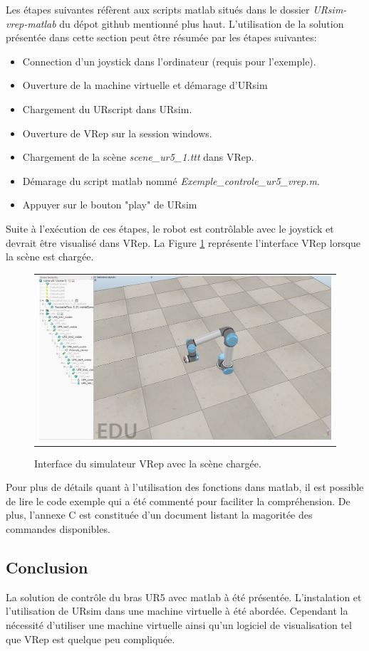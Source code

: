 \documentclass[root.tex]{subfiles}
\begin{document}
Les étapes suivantes réfèrent aux scripts matlab situés dans le dossier \textit{URsim-vrep-matlab} du dépot github mentionné plus haut.
L'utilisation de la solution présentée dans cette section peut être résumée par les étapes suivantes:

\begin{itemize}
\item Connection d'un joystick dans l'ordinateur (requis pour l'exemple).
\item Ouverture de la machine virtuelle et démarage d'URsim
\item Chargement du URscript dans URsim.
\item Ouverture de VRep sur la session windows.
\item Chargement de la scène \textit{scene\_ur5\_1.ttt} dans VRep.
\item Démarage du script matlab nommé \textit{Exemple\_controle\_ur5\_vrep.m}.
\item Appuyer sur le bouton "play" de URsim
\end{itemize}

Suite à l'exécution de ces étapes, le robot est contrôlable avec le joystick et devrait être visualisé dans VRep. La Figure \ref{fig:vrep_scene} représente l'interface VRep lorsque la scène est chargée.
\begin{figure}
 \begin{center}
  \begin{tabular}{c}
    \includegraphics[trim=0cm 0cm 0cm 0cm, scale=0.25]{vrep_ur.png}
  \end{tabular}
 \end{center}
\caption{Interface du simulateur VRep avec la scène chargée.}
 \label{fig:vrep_scene}
\end{figure}
Pour plus de détails quant à l'utilisation des fonctions dans matlab, il est possible de lire le code exemple qui a été commenté pour faciliter la compréhension. De plus, l'annexe C est constituée d'un document listant la magoritée des commandes disponibles.

\subsection{Conclusion}

La solution de contrôle du bras UR5 avec matlab à été présentée.
L'instalation et l'utilisation de URsim dans une machine virtuelle à été abordée.
Cependant la nécessité d'utiliser une machine virtuelle ainsi qu'un logiciel de visualisation tel que VRep est quelque peu compliquée.


\newpage
\end{document}
